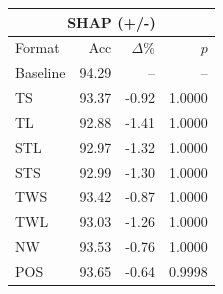 \begin{tabular}{lrrr}
\toprule
\multicolumn{4}{c}{\textbf{SHAP (+/-)}} \\
\midrule
Format & Acc & $\Delta$\% & $p$ \\
\midrule
Baseline & 94.29 & -- & -- \\
\midrule
TS & 93.37 & -0.92 & 1.0000 \\
TL & 92.88 & -1.41 & 1.0000 \\
STL & 92.97 & -1.32 & 1.0000 \\
STS & 92.99 & -1.30 & 1.0000 \\
TWS & 93.42 & -0.87 & 1.0000 \\
TWL & 93.03 & -1.26 & 1.0000 \\
NW & 93.53 & -0.76 & 1.0000 \\
POS & 93.65 & -0.64 & 0.9998 \\
\bottomrule
\end{tabular}